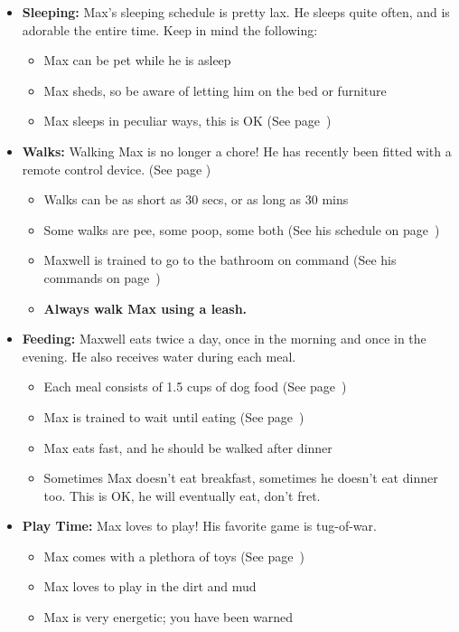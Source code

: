 \documentclass[pdftex,12pt]{article}
\begin{document}
\begin{itemize}\label{itm:schedule}
    \item \textbf{Sleeping:} Max's sleeping schedule is pretty lax. He sleeps
        quite often, and is adorable the entire time. Keep in mind the following:
        \begin{itemize}
            \item Max can be pet while he is asleep
            \item Max sheds, so be aware of letting him on the bed or furniture
            \item Max sleeps in peculiar ways, this is OK
                (See page~\pageref{fig:sleeping})
        \end{itemize}
    \item \textbf{Walks:} Walking Max is no longer a chore! He has recently been fitted
        with a remote control device. (See page \pageref{sec:collar})
        \begin{itemize}
            \item Walks can be as short as 30 secs, or as long as 30 mins
            \item Some walks are pee, some poop, some both
                (See his schedule on page~\pageref{tab:schedule})
            \item Maxwell is trained to go to the bathroom on command
                (See his commands on page~\pageref{tab:commands})
            \item \textbf{Always walk Max using a leash.}
        \end{itemize}
    \item \textbf{Feeding:} Maxwell eats twice a day, once in the morning and
        once in the evening. He also receives water during each meal.
        \begin{itemize}
            \item Each meal consists of 1.5 cups of dog food
                (See page~\pageref{fig:food_bowl_filled})
            \item Max is trained to wait until eating
                (See page~\pageref{fig:food_container_open})
            \item Max eats fast, and he should be walked after dinner
            \item Sometimes Max doesn't eat breakfast, sometimes he doesn't eat dinner too.
                This is OK, he will eventually eat, don't fret.
        \end{itemize}
    \item \textbf{Play Time:} Max loves to play! His favorite game is tug-of-war.
        \begin{itemize}
            \item Max comes with a plethora of toys
                (See page~\pageref{itm:included_items})
            \item Max loves to play in the dirt and mud
            \item Max is very energetic; you have been warned
        \end{itemize}
\end{itemize}
\end{document}

